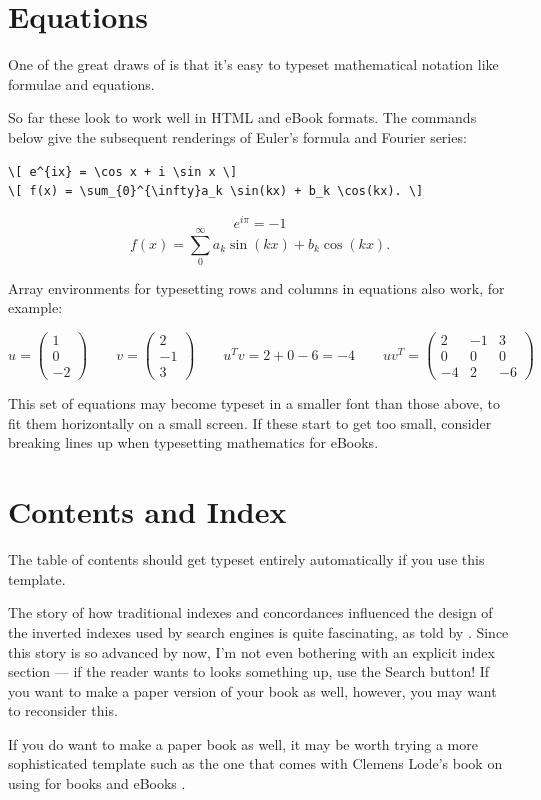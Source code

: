 \section{Equations}

One of the great draws of \latex is that it's easy to typeset mathematical notation like formulae and equations.

So far these look to work well in HTML and eBook formats. The commands below give the subsequent
renderings of Euler's formula and Fourier series:

\begin{verbatim}
\[ e^{ix} = \cos x + i \sin x \]
\[ f(x) = \sum_{0}^{\infty}a_k \sin(kx) + b_k \cos(kx). \]
\end{verbatim}

\[ e^{i\pi} = -1 \]
\[ f(x) = \sum_{0}^{\infty}a_k \sin(kx) + b_k \cos(kx). \]

Array environments for typesetting rows and columns in equations also work, for example:

\[
u = \left( \begin{array}{c} 1 \\ 0 \\ -2 \end{array} \right) \qquad
v = \left( \begin{array}{c} 2 \\ -1 \\ 3 \end{array} \right) \qquad
u^T v = 2 + 0 - 6 = -4 \qquad
u v^T = \left( \begin{array}{ccc} 2 & -1 & 3 \\ 0 & 0 & 0 \\ -4 & 2 & -6 \end{array} \right)
\]

This set of equations may become typeset in a smaller font than those above, to fit them
horizontally on a small screen. If these start to get too small, consider breaking lines up
when typesetting mathematics for eBooks.

\section{Contents and Index}

The table of contents should get typeset entirely automatically if you use this template.

The story of how traditional indexes and concordances influenced the design of the inverted
indexes used by search engines is quite fascinating, as told by \citet[Ch 1]{witten1999gigabytes}.
Since this story is so advanced by now, I'm not even bothering with an explicit index section ---
if the reader wants to looks something up, use the Search button! If you want to make a paper
version of your book as well, however, you may want to reconsider this.

If you do want to make a paper book as well, it may be worth trying a
more sophisticated template such as the one that comes with Clemens
Lode's book on using \latex for books and eBooks \citep{lode2019better}.
